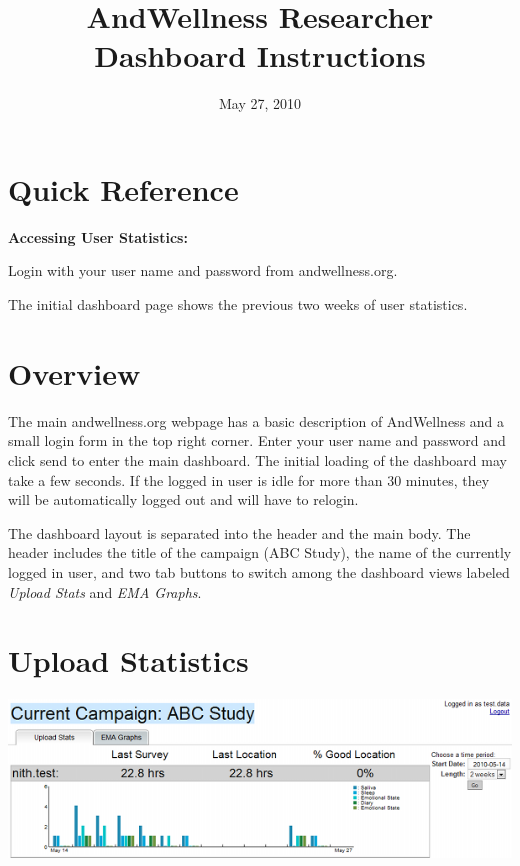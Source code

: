 \documentclass{article}
\title{AndWellness Researcher Dashboard Instructions}
\date{May 27, 2010}
\newcounter{qcounter}
\begin{document}
\maketitle

\section{Quick Reference}
\label{quick_reference}
{\bf Accessing User Statistics:}
\begin{list}{:~}{}
\item Login with your user name and password from andwellness.org.
\item The initial dashboard page shows the previous two weeks of user statistics.
\end{list}


\section{Overview}
\label{overview}
The main andwellness.org webpage has a basic description of AndWellness and a small
login form in the top right corner.  Enter your user name
and password and click send to enter the main dashboard.  The initial loading of the dashboard may take a few seconds.
If the logged in user is idle for more than 30 minutes, they will be automatically logged out and will have to relogin.

The dashboard layout is separated into the header and the main body.
The header includes the title of the campaign (ABC Study), the
name of the currently logged in user, and two tab buttons to switch among the
dashboard views labeled \emph{Upload Stats} and \emph{EMA Graphs}.


\section{Upload Statistics}
\label{upload_statistics}
\begin{center}
	\includegraphics[width=6in]{dashboard-shrunk}
\end{center}
\end{document}
